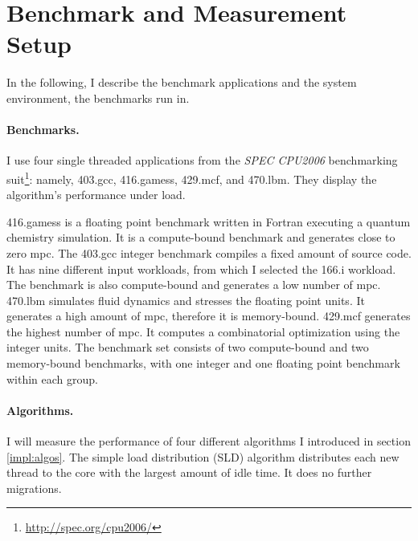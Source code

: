 \section{Benchmark and Measurement Setup}

In the following, I describe the benchmark applications and the
system environment, the benchmarks run in.

\paragraph{Benchmarks.}
I use four single threaded applications from the \emph{SPEC CPU2006} benchmarking
suit\footnote{\url{http://spec.org/cpu2006/}}:
namely, 403.gcc, 416.gamess, 429.mcf, and 470.lbm.
They display the algorithm's performance under load.

416.gamess is a floating point benchmark written in Fortran executing a quantum
chemistry simulation.
It is a compute-bound benchmark and generates close to zero \gls{mpc}.
The 403.gcc integer benchmark compiles a fixed amount of source code.
It has nine different input workloads, from which I selected the 166.i
workload.
The benchmark is also compute-bound and generates a low number of \gls{mpc}.
470.lbm simulates fluid dynamics and stresses the floating point units.
It generates a high amount of \gls{mpc}, therefore it is memory-bound.
429.mcf generates the highest number of \gls{mpc}.
It computes a combinatorial optimization using the integer units.
The benchmark set consists of two compute-bound and two memory-bound
benchmarks, with one integer and one floating point benchmark within each group.

\begin{comment}
Besides the SPEC benchmarks, I employ two other applications to proof the
group configuration awareness of the load balancer one the one side, and the
performance benefits for such a configuration on the other side.
To that end, I use a multi-threaded matrix multiplication for a matrix with
one thousand entries and a client-server application printing the number of the
core it currently runs on.

The latter benchmark shows that client and server are migrated together, as
long as there is only one client per task.
If a task spawn several threads, the balancer distributes the additional
threads to other cores.
\end{comment}


\paragraph{Algorithms.}
I will measure the performance of four different algorithms I introduced in
section \ref{impl:algos}.
The simple load distribution (SLD) algorithm distributes each new thread to the
core with the largest amount of idle time.
It does no further migrations.

